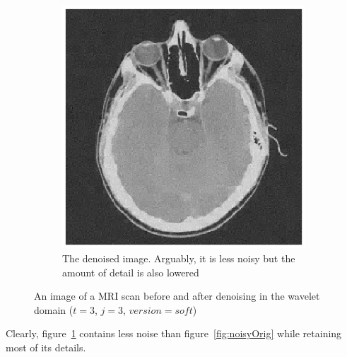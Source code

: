 \begin{figure}[htb]
\begin{subfigure}{.5\textwidth}
  \includegraphics[scale=.7]{noisyMRI_Filtered.eps}
  \caption{The denoised image. Arguably, it is less noisy but the amount of detail is also lowered}
  \label{fig:noisyDenoise}
\end{subfigure}
\caption{An image of a MRI scan before and after denoising in the wavelet domain ($t = 3$, $j = 3$, $version = soft$)}
\label{fig:noiseReductionTest}
\end{figure}

Clearly, figure~\ref{fig:noisyDenoise} contains less noise than figure~\ref{fig:noisyOrig} while retaining most of its details. 
\clearpage